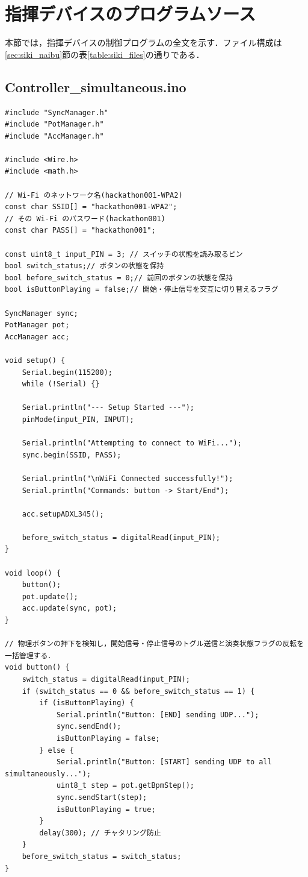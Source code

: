 \section{指揮デバイスのプログラムソース}
\label{sec:apndx_siki}
本節では，指揮デバイスの制御プログラムの全文を示す．ファイル構成は\ref{sec:siki_naibu}節の表\ref{table:siki_files}の通りである．

\subsection{Controller\_simultaneous.ino}
\begin{lstlisting}[caption={Controller\_simultaneous.ino}, label={lst:siki_ino}]
#include "SyncManager.h"
#include "PotManager.h"
#include "AccManager.h"

#include <Wire.h>
#include <math.h>

// Wi-Fi のネットワーク名(hackathon001-WPA2)
const char SSID[] = "hackathon001-WPA2";
// その Wi-Fi のパスワード(hackathon001)
const char PASS[] = "hackathon001";

const uint8_t input_PIN = 3; // スイッチの状態を読み取るピン
bool switch_status;// ボタンの状態を保持
bool before_switch_status = 0;// 前回のボタンの状態を保持
bool isButtonPlaying = false;// 開始・停止信号を交互に切り替えるフラグ

SyncManager sync;
PotManager pot;
AccManager acc;

void setup() {
    Serial.begin(115200);
    while (!Serial) {}

    Serial.println("--- Setup Started ---");
    pinMode(input_PIN, INPUT);

    Serial.println("Attempting to connect to WiFi...");
    sync.begin(SSID, PASS);

    Serial.println("\nWiFi Connected successfully!");
    Serial.println("Commands: button -> Start/End");

    acc.setupADXL345();

    before_switch_status = digitalRead(input_PIN);
}

void loop() {
    button();
    pot.update();
    acc.update(sync, pot);
}

// 物理ボタンの押下を検知し，開始信号・停止信号のトグル送信と演奏状態フラグの反転を一括管理する．
void button() {
    switch_status = digitalRead(input_PIN);
    if (switch_status == 0 && before_switch_status == 1) {
        if (isButtonPlaying) {
            Serial.println("Button: [END] sending UDP...");
            sync.sendEnd();
            isButtonPlaying = false;
        } else {
            Serial.println("Button: [START] sending UDP to all simultaneously...");
            uint8_t step = pot.getBpmStep();
            sync.sendStart(step);
            isButtonPlaying = true;
        }
        delay(300); // チャタリング防止
    }
    before_switch_status = switch_status;
}
\end{lstlisting}

